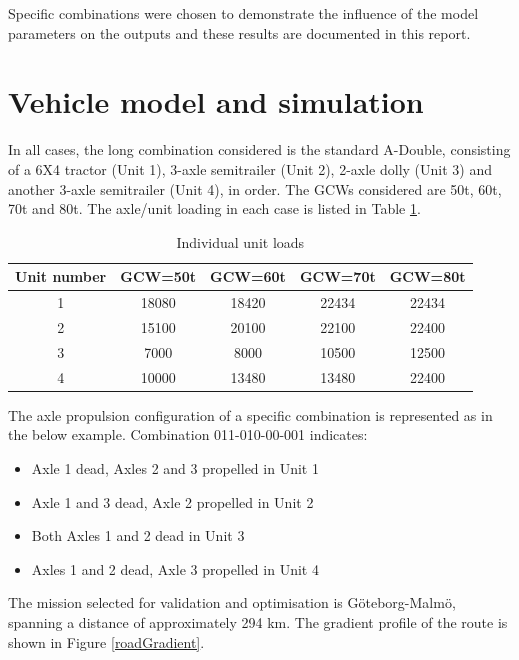 \documentclass{article}
\begin{document}
Specific combinations were chosen to demonstrate the influence of the model parameters on the outputs and these results are documented in this report. 

\section{Vehicle model and simulation}

In all cases, the long combination considered is the standard A-Double, consisting of a 6X4 tractor (Unit 1), 3-axle semitrailer (Unit 2), 2-axle dolly (Unit 3) and another 3-axle semitrailer (Unit 4), in order. The GCWs considered are 50t, 60t, 70t and 80t. The axle/unit loading in each case is listed in Table \ref{table:unitLoads}.\\

\begin{table}[ht]
\caption{Individual unit loads} 
\centering 
\begin{tabular}{c c c c c}
\hline\hline    
Unit number & GCW=50t & GCW=60t  & GCW=70t & GCW=80t \\
 \hline
    1  & 18080 & 18420 & 22434 & 22434\\
    2  & 15100 & 20100 & 22100  & 22400\\
    3  & 7000 & 8000 & 10500 & 12500  \\
    4  & 10000 & 13480 & 13480 & 22400 \\
\hline 
\end{tabular}
\label{table:unitLoads} 
\end{table}

The axle propulsion configuration of a specific combination is represented as in the below example. 
Combination 011-010-00-001 indicates:
\begin{itemize}
\item Axle 1 dead, Axles 2 and 3 propelled in Unit 1
\item Axle 1 and 3 dead, Axle 2 propelled in Unit 2
\item Both Axles 1 and 2 dead in Unit 3
\item Axles 1 and 2 dead, Axle 3 propelled in Unit 4
\end{itemize}

The mission selected for validation and optimisation is G\"oteborg-Malm\"o, spanning a distance of approximately 294 km. The gradient profile of the route is shown in Figure \ref{roadGradient}.
\end{document}
